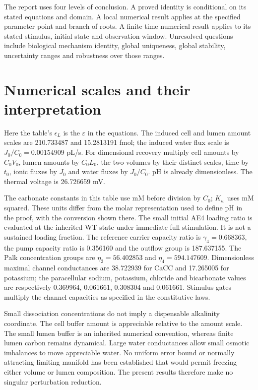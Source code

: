 \documentclass[11pt,a4paper]{article}
\begin{document}
The report uses four levels of conclusion. A proved identity is conditional
on its stated equations and domain. A local numerical result applies at the
specified parameter point and branch of roots. A finite time numerical result
applies to its stated stimulus, initial state and observation window.
Unresolved questions include biological mechanism identity, global uniqueness,
global stability, uncertainty ranges and robustness over those ranges.



\section{Numerical scales and their interpretation}
\begin{center}

\end{center}
Here the table's $\epsilon_L$ is the $\varepsilon$ in the equations.
The induced cell and lumen amount scales are 210.733487 and
15.2813191 fmol; the induced water flux scale is
$J_0/C_0=0.00154909$ pL/s. For dimensional recovery multiply cell amounts
by $C_0V_0$, lumen amounts by $C_0L_0$, the two volumes by their distinct
scales, time by $t_0$, ionic fluxes by $J_0$ and water fluxes by $J_0/C_0$.
pH is already dimensionless. The thermal voltage is 26.726659 mV.

\begin{center}\small

\end{center}
The carbonate constants in this table use mM before division by $C_0$;
$K_w$ uses mM squared. These units differ from the molar representation
used to define pH in the proof, with the conversion shown there.
The small initial AE4 loading ratio is evaluated at the inherited WT state
under immediate full stimulation. It is not a sustained loading fraction.
The reference carrier capacity ratio is $\gamma_4=0.668363$, the pump
capacity ratio is 0.356160 and the outflow group is 187.637155.
The Palk concentration groups are $\eta_2=56.402853$ and
$\eta_4=594.147609$. Dimensionless maximal channel conductances are
38.722939 for CaCC and 17.265005 for potassium; the paracellular sodium,
potassium, chloride and bicarbonate values are respectively 0.369964,
0.061661, 0.308304 and 0.061661. Stimulus gates multiply the channel
capacities as specified in the constitutive laws.

Small dissociation concentrations do not imply a dispensable alkalinity
coordinate. The cell buffer amount is appreciable relative to the amount
scale. The small lumen buffer is an inherited numerical convention, whereas
finite lumen carbon remains dynamical. Large water conductances allow small
osmotic imbalances to move appreciable water. No uniform error bound or
normally attracting limiting manifold has been established that would permit
freezing either volume or lumen composition. The present results therefore
make no singular perturbation reduction.
\end{document}
